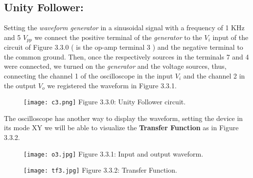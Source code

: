 \subsection{Unity Follower:}

Setting the {\itshape waveform generator} in a sinusoidal signal with a frequency of 1 KHz and 5 $V_{pp}$ we connect the positive terminal of the {\itshape generator} to the $V_{i}$ input of the circuit of Figure 3.3.0 ( is the op-amp terminal 3 ) \linebreak and the negative terminal to the common ground. Then, once the respectively sources in the terminals 7 and 4 were connected, we turned on the {\itshape generator} and the voltage sources, thus, connecting the channel 1 of the oscilloscope in the input $V_{i}$ and the channel 2 in the output $V_{o}$ we registered the waveform in Figure 3.3.1. \hfill \break

\begin{figure}[H]
\texttt{[image: c3.png]}
\centering \linebreak \linebreak Figure 3.3.0: Unity Follower circuit.
\end{figure} \hfill

The oscilloscope has another way to display the waveform, setting the device in its mode XY we will be able to visualize the {\bfseries Transfer Function} as in Figure 3.3.2. \hfill \break

\begin{multicols}{2}
\begin{figure}[H]
\texttt{[image: o3.jpg]}
\centering \linebreak \linebreak Figure 3.3.1: Input and output waveform.
\end{figure}

\begin{figure}[H]
\texttt{[image: tf3.jpg]}
\centering \linebreak \linebreak Figure 3.3.2: Transfer Function.
\end{figure}
\end{multicols} \hfill

{\bfseries\itshape\color{carmine}{Observation:}} {\itshape\color{carmine}{The yellow waveform corresponds to the channel 1 and the blue waveform to channel 2, because it's a unity follower the waveform are exactly the same.}} \hfill \break

